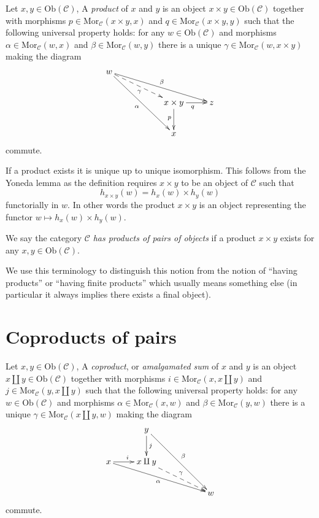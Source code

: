 \begin{definition}
\label{definition-products}
Let $x, y\in \text{Ob}(\mathcal{C})$,
A {\it product} of $x$ and $y$ is
an object $x\times y \in \text{Ob}(\mathcal{C})$
together with morphisms
$p\in \text{Mor}_{\mathcal C}(x\times y, x)$ and
$q\in\text{Mor}_{\mathcal C}(x\times y, y)$ such
that the following universal property holds: for
any $w\in \text{Ob}(\mathcal{C})$ and morphisms
$\alpha \in \text{Mor}_{\mathcal C}(w, x)$ and
$\beta \in \text{Mor}_{\mathcal{C}}(w, y)$
there is a unique
$\gamma\in \text{Mor}_{\mathcal C}(w, x\times y)$ making
the diagram
$$
\xymatrix{
w \ar[rrrd]^\beta \ar@{-->}[rrd]_\gamma \ar[rrdd]_\alpha & & \\
& & x\times y \ar[d]_{p} \ar[r]_{q} & z \\
& & x &
}
$$
commute.
\end{definition}

\noindent
If a product exists it is unique up to unique
isomorphism. This follows from the Yoneda lemma as
the definition requires $x\times y$ to be an object
of $\mathcal{C}$ such that
$$
h_{x\times y}(w) = h_x(w) \times h_y(w)
$$
functorially in $w$. In other words the product $x \times y$
is an object representing the functor
$w \mapsto h_x(w) \times h_y(w)$.

\begin{definition}
\label{definition-has-products-of-pairs}
We say the category $\mathcal{C}$ {\it has products of pairs
of objects} if a product $x \times y$
exists for any $x, y \in \text{Ob}(\mathcal{C})$.
\end{definition}

\noindent
We use this terminology to distinguish this notion from the notion
of ``having products'' or ``having finite products'' which usually means
something else (in particular it always implies there exists a
final object).





\section{Coproducts of pairs}
\label{section-coproducts-pairs}

\begin{definition}
\label{definition-coproducts}
Let $x, y \in \text{Ob}(\mathcal{C})$,
A {\it coproduct}, or {\it amalgamated sum} of $x$ and $y$ is
an object $x \amalg y \in \text{Ob}(\mathcal{C})$
together with morphisms
$i \in \text{Mor}_{\mathcal C}(x, x \amalg y)$ and
$j \in \text{Mor}_{\mathcal C}(y, x \amalg y)$ such
that the following universal property holds: for
any $w \in \text{Ob}(\mathcal{C})$ and morphisms
$\alpha \in \text{Mor}_{\mathcal C}(x, w)$ and
$\beta \in \text{Mor}_{\mathcal{C}}(y, w)$
there is a unique
$\gamma \in \text{Mor}_{\mathcal C}(x \amalg y, w)$ making
the diagram
$$
\xymatrix{
& y \ar[d]^j \ar[rrdd]^\beta \\
x \ar[r]^i \ar[rrrd]_\alpha & x \amalg y \ar@{-->}[rrd]^\gamma \\
& & & w
}
$$
commute.
\end{definition}

